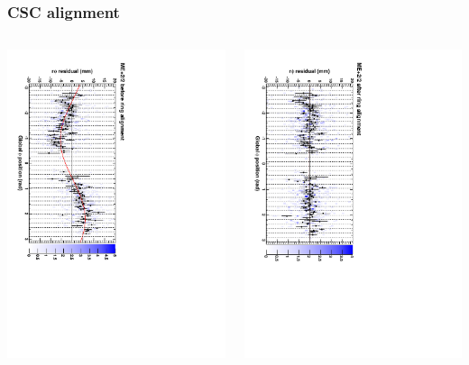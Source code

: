\documentclass[compress]{beamer}
\begin{document}
\begin{frame}
\frametitle{CSC alignment}

\begin{columns}
\includegraphics[height=\linewidth, angle=90]{NOV4_ringfits_before/mep22.pdf}

\includegraphics[height=\linewidth, angle=90]{NOV4_ringfits_after/mep22.pdf}


\end{columns}
\end{frame}
\end{document}
